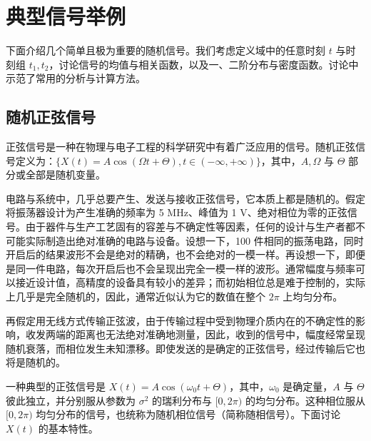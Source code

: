 \documentclass[11pt,openany,UTF8]{ctexbook}
\begin{document}
\section{典型信号举例}
下面介绍几个简单且极为重要的随机信号\nobreak。我们考虑定义域中的任意时刻 $t$ 与时刻组 $t_1,t_2$\nobreak，讨论信号的均值与相关函数\nobreak，以及一\nobreak、二阶分布与密度函数\nobreak。讨论中示范了常用的分析与计算方法\nobreak。

\subsection{随机正弦信号}
正弦信号是一种在物理与电子工程的科学研究中有着广泛应用的信号\nobreak。随机正弦信号定义为\nobreak：$\{X(t)=A\cos(\Omega t+\Theta),t\in(-\infty,+\infty)\}$\nobreak，其中\nobreak，$A,\Omega$ 与 $\Theta$ 部分或全部是随机变量\nobreak。

电路与系统中\nobreak，几乎总要产生\nobreak、发送与接收正弦信号\nobreak，它本质上都是随机的\nobreak。假定将振荡器设计为产生准确的频率为 5 MHz\nobreak、峰值为 1 V\nobreak、绝对相位为零的正弦信号\nobreak。由于器件与生产工艺固有的容差与不确定性等因素\nobreak，任何的设计与生产者都不可能实际制造出绝对准确的电路与设备\nobreak。设想一下\nobreak，100 件相同的振荡电路\nobreak，同时开启后的结果波形不会是绝对的精确\nobreak，也不会绝对的一模一样\nobreak。再设想一下\nobreak，即便是同一件电路\nobreak，每次开启后也不会呈现出完全一模一样的波形\nobreak。通常幅度与频率可以接近设计值\nobreak，高精度的设备具有较小的差异\nobreak；而初始相位总是难于控制的\nobreak，实际上几乎是完全随机的\nobreak，因此\nobreak，通常近似认为它的数值在整个 $2\pi$ 上均匀分布\nobreak。

再假定用无线方式传输正弦波\nobreak，由于传输过程中受到物理介质内在的不确定性的影响\nobreak，收发两端的距离也无法绝对准确地测量\nobreak，因此\nobreak，收到的信号中\nobreak，幅度经常呈现随机衰落\nobreak，而相位发生未知漂移\nobreak。即使发送的是确定的正弦信号\nobreak，经过传输后它也将是随机的\nobreak。

一种典型的正弦信号是 $X(t)=A\cos(\omega_0t+\Theta)$\nobreak，其中\nobreak，$\omega_0$ 是确定量\nobreak，$A$ 与 $\Theta$ 彼此独立\nobreak，并分别服从参数为 $\sigma^2$ 的瑞利分布与 $[0,2\pi)$ 的均匀分布\nobreak。这种相位服从 $[0,2\pi)$ 均匀分布的信号\nobreak，也统称为随机相位信号（简称随相信号\nobreak）\nobreak。下面讨论 $X(t)$ 的基本特性\nobreak。


\end{document}
